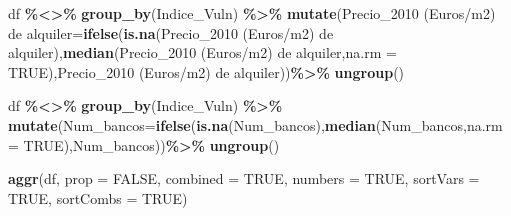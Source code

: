 \documentclass[notspecified,article,submit,moreauthors,pdftex]{Definitions/mdpi}
\newenvironment{Shaded}{\begin{snugshade}}{\end{snugshade}}
\newcommand{\AttributeTok}[1]{\textcolor[rgb]{0.13,0.29,0.53}{#1}}
\newcommand{\ConstantTok}[1]{\textcolor[rgb]{0.56,0.35,0.01}{#1}}
\newcommand{\FunctionTok}[1]{\textcolor[rgb]{0.13,0.29,0.53}{\textbf{#1}}}
\newcommand{\NormalTok}[1]{#1}
\newcommand{\OtherTok}[1]{\textcolor[rgb]{0.56,0.35,0.01}{#1}}
\newcommand{\SpecialCharTok}[1]{\textcolor[rgb]{0.81,0.36,0.00}{\textbf{#1}}}
\newcommand{\StringTok}[1]{\textcolor[rgb]{0.31,0.60,0.02}{#1}}
\begin{document}
\begin{Shaded}
\begin{Highlighting}[]
\NormalTok{df }\SpecialCharTok{\%\textless{}\textgreater{}\%}
  \FunctionTok{group\_by}\NormalTok{(}\StringTok{\textasciigrave{}}\AttributeTok{Indice\_Vuln}\StringTok{\textasciigrave{}}\NormalTok{) }\SpecialCharTok{\%\textgreater{}\%} 
  \FunctionTok{mutate}\NormalTok{(}\StringTok{\textasciigrave{}}\AttributeTok{Precio\_2010 (Euros/m2) de alquiler}\StringTok{\textasciigrave{}}\OtherTok{=}\FunctionTok{ifelse}\NormalTok{(}\FunctionTok{is.na}\NormalTok{(}\StringTok{\textasciigrave{}}\AttributeTok{Precio\_2010 (Euros/m2) de alquiler}\StringTok{\textasciigrave{}}\NormalTok{),}\FunctionTok{median}\NormalTok{(}\StringTok{\textasciigrave{}}\AttributeTok{Precio\_2010 (Euros/m2) de alquiler}\StringTok{\textasciigrave{}}\NormalTok{,}\AttributeTok{na.rm =} \ConstantTok{TRUE}\NormalTok{),}\StringTok{\textasciigrave{}}\AttributeTok{Precio\_2010 (Euros/m2) de alquiler}\StringTok{\textasciigrave{}}\NormalTok{))}\SpecialCharTok{\%\textgreater{}\%}
  \FunctionTok{ungroup}\NormalTok{() }
\end{Highlighting}
\end{Shaded}

\begin{Shaded}
\begin{Highlighting}[]
\NormalTok{df }\SpecialCharTok{\%\textless{}\textgreater{}\%}
  \FunctionTok{group\_by}\NormalTok{(}\StringTok{\textasciigrave{}}\AttributeTok{Indice\_Vuln}\StringTok{\textasciigrave{}}\NormalTok{) }\SpecialCharTok{\%\textgreater{}\%} 
  \FunctionTok{mutate}\NormalTok{(}\StringTok{\textasciigrave{}}\AttributeTok{Num\_bancos}\StringTok{\textasciigrave{}}\OtherTok{=}\FunctionTok{ifelse}\NormalTok{(}\FunctionTok{is.na}\NormalTok{(}\StringTok{\textasciigrave{}}\AttributeTok{Num\_bancos}\StringTok{\textasciigrave{}}\NormalTok{),}\FunctionTok{median}\NormalTok{(}\StringTok{\textasciigrave{}}\AttributeTok{Num\_bancos}\StringTok{\textasciigrave{}}\NormalTok{,}\AttributeTok{na.rm =} \ConstantTok{TRUE}\NormalTok{),}\StringTok{\textasciigrave{}}\AttributeTok{Num\_bancos}\StringTok{\textasciigrave{}}\NormalTok{))}\SpecialCharTok{\%\textgreater{}\%}
  \FunctionTok{ungroup}\NormalTok{() }
\end{Highlighting}
\end{Shaded}

\begin{Shaded}
\begin{Highlighting}[]
\FunctionTok{aggr}\NormalTok{(df, }\AttributeTok{prop =} \ConstantTok{FALSE}\NormalTok{, }\AttributeTok{combined =} \ConstantTok{TRUE}\NormalTok{, }\AttributeTok{numbers =} \ConstantTok{TRUE}\NormalTok{, }\AttributeTok{sortVars =} \ConstantTok{TRUE}\NormalTok{, }\AttributeTok{sortCombs =} \ConstantTok{TRUE}\NormalTok{)}
\end{Highlighting}
\end{Shaded}
\end{document}

